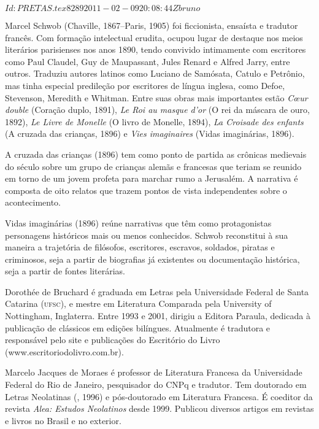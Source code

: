 \SVN $Id: PRETAS.tex 8289 2011-02-09 20:08:44Z bruno $
\begin{resumopage}

\item[Marcel Schwob] (Chaville, 1867--Paris, 1905) foi ficcionista, ensaísta e tradutor francês. 
Com formação intelectual erudita, ocupou lugar de destaque nos meios literários parisienses
nos anos 1890, tendo convivido intimamente com escritores como Paul Claudel,
Guy de Maupassant, Jules Renard e Alfred Jarry, entre outros. Traduziu autores
latinos como Luciano de Samósata, Catulo e Petrônio, mas tinha especial
predileção por escritores de língua inglesa, como Defoe, Stevenson, Meredith e
Whitman. Entre suas obras mais importantes estão \textit{Cœur double}
(Coração duplo, 1891), \textit{Le Roi au masque d’or} (O rei
da máscara de ouro, 1892), \textit{Le Livre de Monelle} (O livro de
Monelle, 1894), \textit{La Croisade des enfants} (A cruzada das
crianças, 1896) e \textit{Vies imaginaires} (Vidas imaginárias, 1896).

\item[A cruzada das crianças] (1896) tem como ponto de partida as crônicas medievais do século  
sobre um grupo de crianças alemãs e francesas que teriam se reunido em torno de um jovem profeta para
marchar rumo a Jerusalém. A narrativa é composta de oito relatos que trazem
pontos de vista independentes sobre o acontecimento.

\item[Vidas imaginárias] (1896) reúne narrativas que têm como protagonistas personagens históricos
mais ou menos conhecidos. Schwob reconstitui à sua maneira a trajetória de
filósofos, escritores, escravos, soldados, piratas e criminosos, seja a partir
de biografias já existentes ou documentação histórica, seja a
partir de fontes literárias.
        
\item[Dorothée de Bruchard] é graduada em Letras pela Universidade Federal
de Santa Catarina (\textsc{ufsc}), e mestre em Literatura Comparada pela University of
Nottingham, Inglaterra. Entre 1993 e 2001, dirigiu a Editora Paraula, dedicada à
publicação de clássicos em edições bilíngues. Atualmente é tradutora e responsável pelo 
site e publicações do Escritório do Livro (www.escritoriodolivro.com.br). 

\item[Marcelo Jacques de Moraes] é professor de Literatura Francesa da
Universidade Federal do Rio de Janeiro, pesquisador do CNPq e tradutor. Tem
doutorado em Letras Neolatinas (, 1996) e pós-doutorado em Literatura
Francesa. É coeditor da revista \textit{Alea: Estudos Neolatinos} desde 1999. 
Publicou diversos artigos em revistas e livros no Brasil e no exterior. 

\end{resumopage}

















